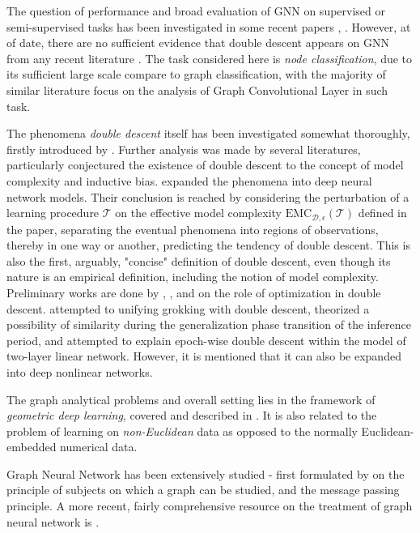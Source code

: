 \begin{description}[style=unboxed,leftmargin=0cm]
    \item[Performance and Evaluation] The question of performance and broad evaluation of GNN on supervised or semi-supervised tasks has been investigated in some recent papers \cite{Oono2020Graph}, \cite{shi2024homophilymodulatesdoubledescent}. However, at of date, there are no sufficient evidence that double descent appears on GNN from any recent literature \cite{Oono2020Graph}. The task considered here is \textit{node classification}, due to its sufficient large scale compare to graph classification, with the majority of similar literature focus on the analysis of Graph Convolutional Layer in such task.  
    \item[Double descent] The phenomena \textit{double descent} itself has been investigated somewhat thoroughly, firstly introduced by \cite{belkin_reconciling_2019}. Further analysis was made by several literatures, particularly conjectured the existence of double descent to the concept of model complexity and inductive bias. \cite{nakkiran_deep_2019} expanded the phenomena into deep neural network models. Their conclusion is reached by considering the perturbation of a learning procedure $\mathcal{T}$ on the effective model complexity $\mathrm{EMC}_{\mathcal{D},\epsilon}(\mathcal{T})$ defined in the paper, separating the eventual phenomena into regions of observations, thereby in one way or another, predicting the tendency of double descent. This is also the first, arguably, "concise" definition of double descent, even though its nature is an empirical definition, including the notion of model complexity. Preliminary works are done by \cite{lafon_understanding_2024}, \cite{schaeffer_double_2023}, and \cite{liu2023understandingroleoptimizationdouble} on the role of optimization in double descent. \cite{davies_unifying_2023} attempted to unifying grokking with double descent, theorized a possibility of similarity during the generalization phase transition of the inference period, and \cite{olmin2024understandingepochwisedoubledescent} attempted to explain epoch-wise double descent within the model of two-layer linear network. However, it is mentioned that it can also be expanded into deep nonlinear networks. 
    \item[Graph Analysis] The graph analytical problems and overall setting lies in the framework of \textit{geometric deep learning}, covered and described in \cite{bronstein2021geometricdeeplearninggrids,Bronstein_2017}. It is also related to the problem of learning on \textit{non-Euclidean} data as opposed to the normally Euclidean-embedded numerical data. 
    \item[GNN] Graph Neural Network has been extensively studied - first formulated by \cite{Scar04} on the principle of subjects on which a graph can be studied, and the message passing principle. A more recent, fairly comprehensive resource on the treatment of graph neural network is \cite{GRP_Hamilton}. 
\end{description}